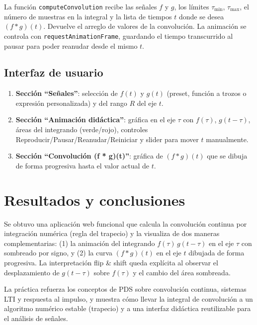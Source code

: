 \documentclass[12pt,a4paper]{article}
\begin{document}
La función \texttt{computeConvolution} recibe las señales \(f\) y \(g\), los límites \(\tau_{\min}\), \(\tau_{\max}\), el número de muestras en la integral y la lista de tiempos \(t\) donde se desea \((f*g)(t)\). Devuelve el arreglo de valores de la convolución. La animación se controla con \texttt{requestAnimationFrame}, guardando el tiempo transcurrido al pausar para poder reanudar desde el mismo \(t\).

\subsection{Interfaz de usuario}

\begin{enumerate}
  \item \textbf{Sección ``Señales''}: selección de \(f(t)\) y \(g(t)\) (preset, función a trozos o expresión personalizada) y del rango \(R\) del eje \(t\).
  \item \textbf{Sección ``Animación didáctica''}: gráfica en el eje \(\tau\) con \(f(\tau)\), \(g(t-\tau)\), áreas del integrando (verde/rojo), controles Reproducir/Pausar/Reanudar/Reiniciar y slider para mover \(t\) manualmente.
  \item \textbf{Sección ``Convolución (f * g)(t)''}: gráfica de \((f*g)(t)\) que se dibuja de forma progresiva hasta el valor actual de \(t\).
\end{enumerate}

\section{Resultados y conclusiones}

Se obtuvo una aplicación web funcional que calcula la convolución continua por integración numérica (regla del trapecio) y la visualiza de dos maneras complementarias: (1) la animación del integrando \(f(\tau)\,g(t-\tau)\) en el eje \(\tau\) con sombreado por signo, y (2) la curva \((f*g)(t)\) en el eje \(t\) dibujada de forma progresiva. La interpretación flip \& shift queda explícita al observar el desplazamiento de \(g(t-\tau)\) sobre \(f(\tau)\) y el cambio del área sombreada.

La práctica refuerza los conceptos de PDS sobre convolución continua, sistemas LTI y respuesta al impulso, y muestra cómo llevar la integral de convolución a un algoritmo numérico estable (trapecio) y a una interfaz didáctica reutilizable para el análisis de señales.
\end{document}
